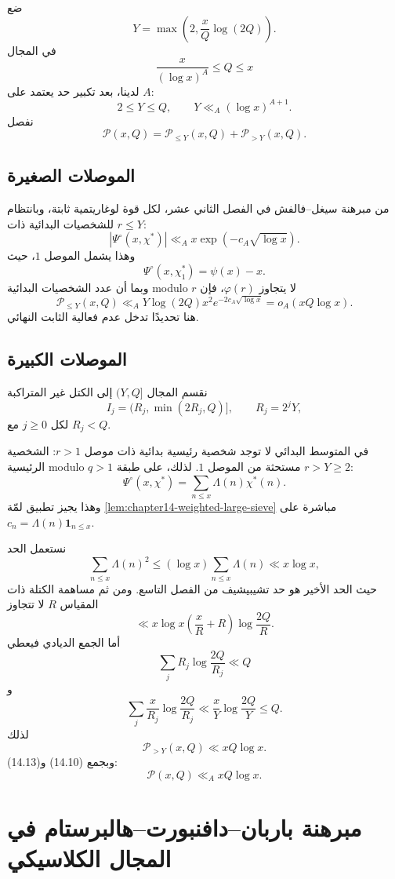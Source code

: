 ضع
\[
Y=\max\!\left(2,\frac{x}{Q}\log(2Q)\right).
\tag{14.8}
\]
في المجال
\[
\frac{x}{(\log x)^A}\le Q\le x
\]
لدينا، بعد تكبير حد يعتمد على \(A\):
\[
2\le Y\le Q,
\qquad
Y\ll_A(\log x)^{A+1}.
\tag{14.9}
\]
نفصل
\[
\mathcal P(x,Q)=\mathcal P_{\le Y}(x,Q)+\mathcal P_{>Y}(x,Q).
\]

\subsection{الموصلات الصغيرة}

من مبرهنة سيغل--فالفش في الفصل الثاني عشر، لكل قوة لوغاريتمية ثابتة، وبانتظام
للشخصيات البدائية ذات \(r\le Y\):
\[
|\Psi^\circ(x,\chi^*)|
\ll_A
x\exp(-c_A\sqrt{\log x}).
\]
وهذا يشمل الموصل \(1\)، حيث
\[
\Psi^\circ(x,\chi_1^*)=\psi(x)-x.
\]
وبما أن عدد الشخصيات البدائية modulo \(r\) لا يتجاوز \(\varphi(r)\)، فإن
\[
\mathcal P_{\le Y}(x,Q)
\ll_A
Y\log(2Q)x^2e^{-2c_A\sqrt{\log x}}
=o_A(xQ\log x).
\tag{14.10}
\]
هنا تحديدًا تدخل عدم فعالية الثابت النهائي.

\subsection{الموصلات الكبيرة}

نقسم المجال \((Y,Q]\) إلى الكتل غير المتراكبة
\[
I_j=(R_j,\min(2R_j,Q)],
\qquad R_j=2^jY,
\]
لكل \(j\ge0\) مع \(R_j<Q\).

في المتوسط البدائي لا توجد شخصية رئيسية بدائية ذات موصل \(r>1\): الشخصية
الرئيسية modulo \(q>1\) مستحثة من الموصل \(1\). لذلك، على طبقة
\(r>Y\ge2\):
\[
\Psi^\circ(x,\chi^*)
=
\sum_{n\le x}\Lambda(n)\chi^*(n).
\tag{14.11}
\]
وهذا يجيز تطبيق لمّة \ref{lem:chapter14-weighted-large-sieve} مباشرة على
\(c_n=\Lambda(n)\mathbf1_{n\le x}\).

نستعمل الحد
\[
\sum_{n\le x}\Lambda(n)^2
\le
(\log x)\sum_{n\le x}\Lambda(n)
\ll x\log x,
\tag{14.12}
\]
حيث الحد الأخير هو حد تشيبيشيف من الفصل التاسع. ومن ثم مساهمة الكتلة ذات
المقياس \(R\) لا تتجاوز
\[
\ll
x\log x
\left(\frac{x}{R}+R\right)
\log\frac{2Q}{R}.
\]
أما الجمع الديادي فيعطي
\[
\sum_jR_j\log\frac{2Q}{R_j}\ll Q
\]
و
\[
\sum_j\frac{x}{R_j}\log\frac{2Q}{R_j}
\ll
\frac{x}{Y}\log\frac{2Q}{Y}
\le Q.
\]
لذلك
\[
\mathcal P_{>Y}(x,Q)\ll xQ\log x.
\tag{14.13}
\]
وبجمع (14.10) و(14.13):
\[
\mathcal P(x,Q)\ll_A xQ\log x.
\tag{14.14}
\]

\section{مبرهنة باربان--دافنبورت--هالبرستام في المجال الكلاسيكي}

